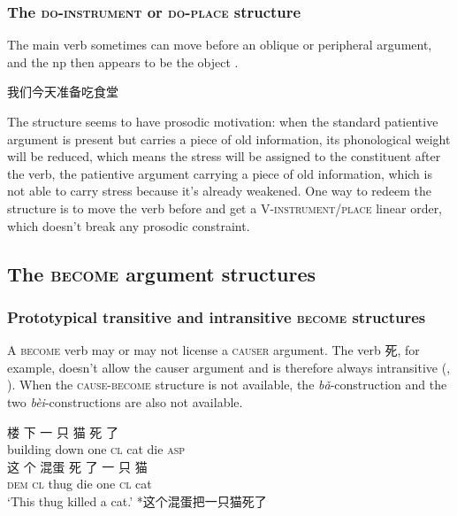 \documentclass[UTF8, a4paper, oneside, scheme=plain, 12pt]{ctexrep}
\newcommand*{\citesec}[1]{\S~{#1}}
\newcommand*{\citechap}[1]{chap.~{#1}}
\newcommand{\form}[1]{\emph{#1}}
\newcommand{\translate}[1]{`#1'}
\newcommand*{\category}[1]{\textsc{#1}}
\begin{document}
\subsubsection{The \category{do}-\category{instrument} or \category{do}-\category{place} structure}

The main verb sometimes can move before an oblique or peripheral argument, 
and the \acs{np} then appears to be the object
\citep[\citechap{4}, \citesec{5}]{feng2000}.

\begin{exe}
    \ex 我们今天准备吃食堂
\end{exe}

The structure seems to have prosodic motivation:
when the standard patientive argument is present 
but carries a piece of old information,
its phonological weight will be reduced,
which means the stress will be assigned to the constituent after the verb,
the patientive argument carrying a piece of old information,
which is not able to carry stress because it's already weakened.
One way to redeem the structure 
is to move the verb before 
and get a V-\category{instrument/place} linear order, 
which doesn't break any prosodic constraint.

\subsection{The \category{become} argument structures}\label{sec:verb-phrase.become}

\subsubsection{Prototypical transitive and intransitive \category{become} structures}
\label{sec:verb-phrase.cause-become.ordinary}

A \category{become} verb may or may not license a \category{causer} argument.
The verb 死, for example, doesn't allow the causer argument
and is therefore always intransitive
(,
).
When the \category{cause}-\category{become} structure is not available,
the \form{bǎ}-construction 
and the two \form{bèi}-constructions 
are also not available.

\begin{exe}
    \ex\label{ex:verb-phrase.cause-become.ordinary.1} \gll 楼 下 一 只 猫 死 了  \\
    building down one \category{cl} cat die \category{asp} \\ 
    \ex\label{ex:verb-phrase.cause-become.ordinary.1-no-transitive} \gll * 这 个 混蛋 死 了 一 只 猫 \\
    {} \category{dem} \category{cl} thug die one \category{cl} cat \\ 
    \translate{This thug killed a cat.} 
    \ex\label{ex:verb-phrase.cause-become.ordinary.1-no-ba} *这个混蛋把一只猫死了
\end{exe}
\end{document}
